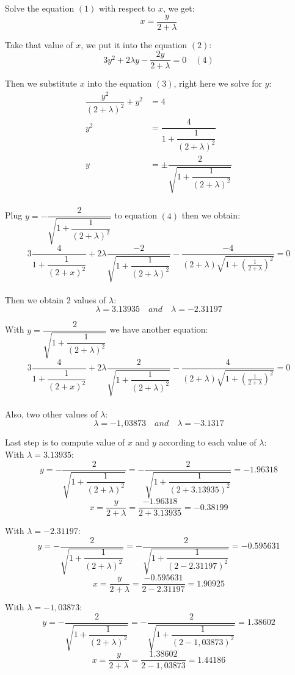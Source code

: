 Solve the equation $(1)$ with respect to $x$, we get:
$$ x = \dfrac{y}{2 + \lambda} $$

Take that value of $x$, we put it into the equation $(2)$:
$$ 3y^2 + 2 \lambda y - \dfrac{2y}{2 + \lambda} = 0 \quad (4)$$

Then we substitute $x$ into the equation $(3)$, right here we solve for $y$:
\begin{align*}
  \dfrac{y^2}{(2 + \lambda)^2} + y^2 &= 4 \\
  y^2 &= \dfrac{4}{1 + \dfrac{1}{(2 + \lambda)^2}} \\
  y &= \pm \dfrac{2}{  \sqrt{1 + \dfrac{1}{(2+ \lambda)^2}}  } \\
\end{align*}

Plug $y = -\dfrac{2}{  \sqrt{1 + \dfrac{1}{(2+ \lambda)^2}}  }$ to equation $(4)$ then we obtain:
$$ 3 \dfrac{4}{1 + \dfrac{1}{(2+x)^2}} + 2 \lambda \dfrac{-2}{ \sqrt{1 + \dfrac{1}{(2 + \lambda)^2}} } - \dfrac{-4}{(2 + \lambda) \sqrt{1 + \left(\frac{1}{2 + \lambda}\right)^2} } = 0 $$\\[6pt]

Then we obtain 2 values of $\lambda$:
$$ \lambda = 3.13935 \quad and \quad \lambda = -2.31197 $$

With $y = \dfrac{2}{  \sqrt{1 + \dfrac{1}{(2+ \lambda)^2}}  }$ we have another equation:
$$ 3 \dfrac{4}{1 + \dfrac{1}{(2+x)^2}} + 2 \lambda \dfrac{2}{ \sqrt{1 + \dfrac{1}{(2 + \lambda)^2}} } - \dfrac{4}{(2 + \lambda) \sqrt{1 + \left(\frac{1}{2 + \lambda}\right)^2} } = 0 $$\\[6pt]

Also, two other values of $\lambda$:
$$ \lambda = -1,03873 \quad and \quad \lambda = -3.1317 $$

Last step is to compute value of $x$ and $y$ according to each value of $\lambda$: \\
With $\lambda = 3.13935$:
$$ y = -\dfrac{2}{ \sqrt{1 + \dfrac{1}{(2 + \lambda)^2}} } = -\dfrac{2}{ \sqrt{1 + \dfrac{1}{(2 + 3.13935)^2}} } = -1.96318$$
$$ x = \dfrac{y}{2 + \lambda} = \dfrac{-1.96318}{2 + 3.13935} = -0.38199 $$

With $\lambda = -2.31197$: 
$$ y = -\dfrac{2}{ \sqrt{1 + \dfrac{1}{(2 + \lambda)^2}} } = -\dfrac{2}{ \sqrt{1 + \dfrac{1}{(2 -2.31197)^2}} } = -0.595631$$
$$ x = \dfrac{y}{2 + \lambda} = \dfrac{-0.595631}{2 -2.31197} = 1.90925 $$

With $\lambda = -1,03873$: 
$$ y = -\dfrac{2}{ \sqrt{1 + \dfrac{1}{(2 + \lambda)^2}} } = -\dfrac{2}{ \sqrt{1 + \dfrac{1}{(2 -1,03873)^2}} } =1.38602$$
$$ x = \dfrac{y}{2 + \lambda} = \dfrac{1.38602}{2 -1,03873} = 1.44186 $$

